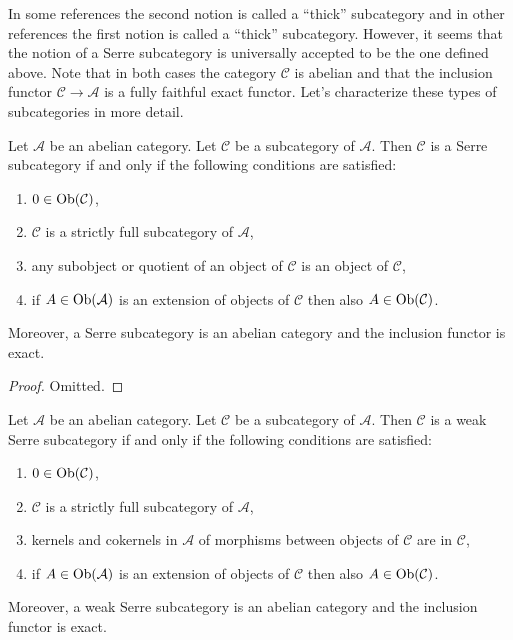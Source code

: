 \noindent
In some references the second notion is called a ``thick'' subcategory
and in other references the first notion is called a ``thick'' subcategory.
However, it seems that the notion of a Serre subcategory is universally
accepted to be the one defined above. Note that in both cases the category
$\mathcal{C}$ is abelian and that the inclusion functor
$\mathcal{C} \to \mathcal{A}$ is a fully faithful exact functor.
Let's characterize these types of subcategories in more detail.

\begin{lemma}
\label{lemma-characterize-serre-subcategory}
Let $\mathcal{A}$ be an abelian category.
Let $\mathcal{C}$ be a subcategory of $\mathcal{A}$.
Then $\mathcal{C}$ is a Serre subcategory if and only if
the following conditions are satisfied:
\begin{enumerate}
\item $0 \in \mathop{\mathrm{Ob}}\nolimits(\mathcal{C})$,
\item $\mathcal{C}$ is a strictly full subcategory of $\mathcal{A}$,
\item any subobject or quotient of an object of $\mathcal{C}$ is an object
of $\mathcal{C}$,
\item if $A \in \mathop{\mathrm{Ob}}\nolimits(\mathcal{A})$ is an extension of objects of $\mathcal{C}$
then also $A \in \mathop{\mathrm{Ob}}\nolimits(\mathcal{C})$.
\end{enumerate}
Moreover, a Serre subcategory is an abelian category and
the inclusion functor is exact.
\end{lemma}

\begin{proof}
Omitted.
\end{proof}

\begin{lemma}
\label{lemma-characterize-weak-serre-subcategory}
Let $\mathcal{A}$ be an abelian category.
Let $\mathcal{C}$ be a subcategory of $\mathcal{A}$.
Then $\mathcal{C}$ is a weak Serre subcategory if and only if
the following conditions are satisfied:
\begin{enumerate}
\item $0 \in \mathop{\mathrm{Ob}}\nolimits(\mathcal{C})$,
\item $\mathcal{C}$ is a strictly full subcategory of $\mathcal{A}$,
\item kernels and cokernels in $\mathcal{A}$ of morphisms
between objects of $\mathcal{C}$ are in $\mathcal{C}$,
\item if $A \in \mathop{\mathrm{Ob}}\nolimits(\mathcal{A})$ is an extension of objects of $\mathcal{C}$
then also $A \in \mathop{\mathrm{Ob}}\nolimits(\mathcal{C})$.
\end{enumerate}
Moreover, a weak Serre subcategory is an abelian category and
the inclusion functor is exact.
\end{lemma}

